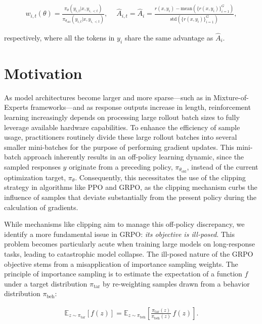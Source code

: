 \begin{align}
    w_{i,t}(\theta)=\frac{ \pi_{\theta} (y_{i,t} | x, y_{i,<t}) }{ \pi_{\theta_\text{old}} (y_{i,t} | x,y_{i,<t})},\quad\ 
    \widehat{A}_{i,t} = \widehat{A}_{i} = \frac{r(x, y_i) - \mathrm{mean} \left( \{ r(x, y_i) \}_{i=1}^G \right) }{ \mathrm{std} \left( \{ r(x, y_i) \}_{i=1}^G \right) },
\end{align}

respectively, where all the tokens in $y_i$ share the same advantage as $\widehat{A}_{i}$.

\section{Motivation}
\label{sec:motivation}

As model architectures become larger and more sparse—such as in Mixture-of-Experts frameworks—and as response outputs increase in length, reinforcement learning increasingly depends on processing large rollout batch sizes to fully leverage available hardware capabilities. To enhance the efficiency of sample usage, practitioners routinely divide these large rollout batches into several smaller mini-batches for the purpose of performing gradient updates. This mini-batch approach inherently results in an off-policy learning dynamic, since the sampled responses $y$ originate from a preceding policy, $\pi_{\theta_\text{old}}$, instead of the current optimization target, $\pi_\theta$. Consequently, this necessitates the use of the clipping strategy in algorithms like PPO and GRPO, as the clipping mechanism curbs the influence of samples that deviate substantially from the present policy during the calculation of gradients.

While mechanisms like clipping aim to manage this off-policy discrepancy, we identify a more fundamental issue in GRPO: \textit{its objective is ill-posed}. This problem becomes particularly acute when training large models on long-response tasks, leading to catastrophic model collapse. The ill-posed nature of the GRPO objective stems from a misapplication of importance sampling weights. The principle of importance sampling is to estimate the expectation of a function $f$ under a target distribution $\pi_\text{tar}$ by re-weighting samples drawn from a behavior distribution $\pi_\text{beh}$:

\begin{align}
\mathbb{E}_{z \sim \pi_\text{tar}} \left[ f(z) \right] = \mathbb{E}_{z \sim \pi_\text{beh}} \left[ \frac{ \pi_\text{tar} (z) }{ \pi_\text{beh} (z)} \, f(z) \right].
\end{align}

